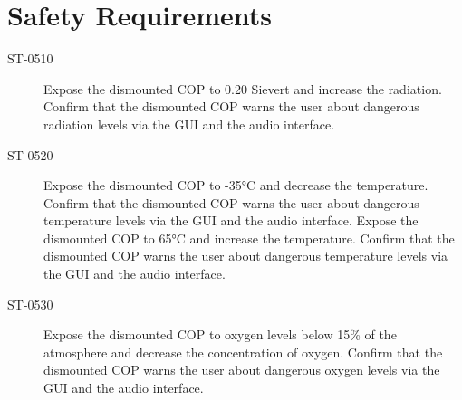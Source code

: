 \section{Safety Requirements}

\begin{description}
\item[ST-0510] Expose the dismounted COP to 0.20 Sievert and increase the radiation. Confirm that the dismounted COP warns the user about dangerous radiation levels via the GUI and the audio interface.
\item[ST-0520] Expose the dismounted COP to -35°C and decrease the temperature. Confirm that the dismounted COP warns the user about dangerous temperature levels via the GUI and the audio interface. Expose the dismounted COP to 65°C and increase the temperature. Confirm that the dismounted COP warns the user about dangerous temperature levels via the GUI and the audio interface.
\item[ST-0530] Expose the dismounted COP to oxygen levels below 15\% of the atmosphere and decrease the concentration of oxygen. Confirm that the dismounted COP warns the user about dangerous oxygen levels via the GUI and the audio interface.
\end{description}